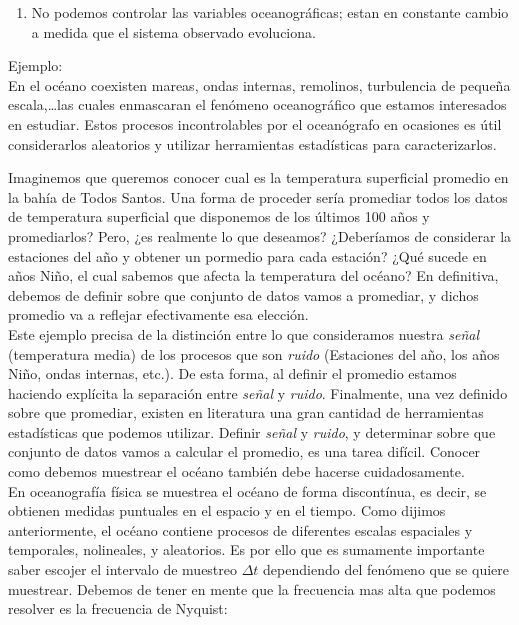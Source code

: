 \documentclass[
]{agujournal2019}
\providecommand{\tightlist}{%
  \setlength{\itemsep}{0pt}\setlength{\parskip}{0pt}}\usepackage{longtable,booktabs,array}
\begin{document}
\begin{enumerate}
\def\labelenumi{\arabic{enumi}.}
\setcounter{enumi}{2}
\tightlist
\item
  No podemos controlar las variables oceanográficas; estan en constante
  cambio a medida que el sistema observado evoluciona.
\end{enumerate}

\vspace{0.5cm}

Ejemplo:\\
En el océano coexisten mareas, ondas internas, remolinos, turbulencia de
pequeña escala,\ldots las cuales enmascaran el fenómeno oceanográfico
que estamos interesados en estudiar. Estos procesos incontrolables por
el oceanógrafo en ocasiones es útil considerarlos aleatorios y utilizar
herramientas estadísticas para caracterizarlos.

Imaginemos que queremos conocer cual es la temperatura superficial
promedio en la bahía de Todos Santos. Una forma de proceder sería
promediar todos los datos de temperatura superficial que disponemos de
los últimos 100 años y promediarlos? Pero, ¿es realmente lo que
deseamos? ¿Deberíamos de considerar la estaciones del año y obtener un
pormedio para cada estación? ¿Qué sucede en años Niño, el cual sabemos
que afecta la temperatura del océano? En definitiva, debemos de definir
sobre que conjunto de datos vamos a promediar, y dichos promedio va a
reflejar efectivamente esa elección.\\

Este ejemplo precisa de la distinción entre lo que consideramos nuestra
\emph{señal} (temperatura media) de los procesos que son \emph{ruido}
(Estaciones del año, los años Niño, ondas internas, etc.). De esta
forma, al definir el promedio estamos haciendo explícita la separación
entre \emph{señal} y \emph{ruido}. Finalmente, una vez definido sobre
que promediar, existen en literatura una gran cantidad de herramientas
estadísticas que podemos utilizar. Definir \emph{señal} y \emph{ruido},
y determinar sobre que conjunto de datos vamos a calcular el promedio,
es una tarea difícil. Conocer como debemos muestrear el océano también
debe hacerse cuidadosamente.\\

En oceanografía física se muestrea el océano de forma discontínua, es
decir, se obtienen medidas puntuales en el espacio y en el tiempo. Como
dijimos anteriormente, el océano contiene procesos de diferentes escalas
espaciales y temporales, nolineales, y aleatorios. Es por ello que es
sumamente importante saber escojer el intervalo de muestreo
\(\Delta{t}\) dependiendo del fenómeno que se quiere muestrear. Debemos
de tener en mente que la frecuencia mas alta que podemos resolver es la
frecuencia de Nyquist:
\end{document}
